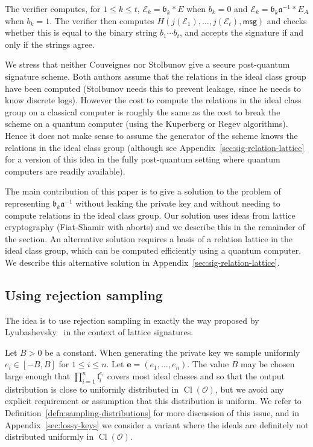 \documentclass{llncs}
\newcommand{\E}{\mathcal{E}}
\newcommand{\OO}{\mathcal{O}}
\DeclareMathOperator{\Cl}{Cl}
\newcommand{\msg}{\mathsf{msg}}
\renewcommand{\a}{\mathfrak{a}}
\renewcommand{\b}{\mathfrak{b}}
\renewcommand{\l}{\mathfrak{l}}
\newcommand{\e}{\mathbf{e}}
\begin{document}
The verifier computes, for $1 \le k \le t$, $\E_k = \b_k * E$ when $b_k = 0$ and $\E_k = \b_k \a^{-1} * E_A$ when $b_k = 1$. The verifier then computes $H( j( \E_1), \dots, j(\E_t), \msg )$ and checks whether this is equal to the binary string $b_1\cdots b_t$, and accepts the signature if and only if the strings agree.


We stress that neither Couveignes nor Stolbunov give a secure post-quantum signature scheme.
Both authors assume that the relations in the ideal class group have been computed (Stolbunov needs this to prevent leakage, since he needs to know discrete logs).
However the cost to compute the relations in the ideal class group on a classical computer is roughly the same as the cost to break the scheme on a quantum computer (using the Kuperberg or Regev algorithms).
Hence it does not make sense to assume the generator of the scheme knows the relations in the ideal class group (although see Appendix~\ref{sec:sig-relation-lattice} for a version of this idea in the fully post-quantum setting where quantum computers are readily available).

The main contribution of this paper is to give a solution to the problem of representing $\b_k \a^{-1}$ without leaking the private key and without needing to compute relations in the ideal class group.
Our solution uses ideas from lattice cryptography (Fiat-Shamir with aborts) and we describe this in the remainder of the section.
An alternative solution requires a basis of a relation lattice in the ideal class group, which can be computed efficiently using a quantum computer. We describe this alternative solution in Appendix~\ref{sec:sig-relation-lattice}.





\subsection{Using rejection sampling}\label{sec:sig-reject-sample}

The idea is to use rejection sampling in exactly the way proposed by Lyubashevsky~\cite{Lyu09} in the context of lattice signatures.

Let $B > 0$ be a constant. When generating the private key we sample uniformly $e_i \in [-B, B]$ for $1 \le i \le n$. Let $\e = ( e_1, \dots, e_n )$.
The value $B$ may be chosen large enough that $\prod_{i=1}^n \l_i^{e_i}$ covers most ideal classes and so that the output distribution is close to uniformly distributed in $\Cl(\OO)$, but we avoid any explicit requirement or assumption that this distribution is uniform.
We refer to Definition~\ref{defn:sampling-distributions} for more discussion of this issue, and in Appendix~\ref{sec:lossy-keys} we consider a variant where the ideals are definitely not distributed uniformly in $\Cl(\OO)$.
\end{document}
